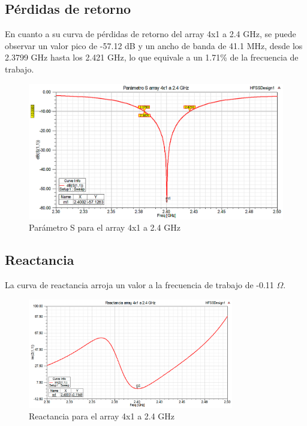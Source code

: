 \subsection{Pérdidas de retorno}
\par En cuanto a su curva de pérdidas de retorno del array 4x1 a 2.4 GHz, se puede observar un valor pico de -57.12 dB y un ancho de banda de 41.1 MHz, desde los 2.3799 GHz hasta los 2.421 GHz, lo que equivale a un 1.71\% de la frecuencia de trabajo.
\\
\begin{figure}[H]
    \centering
        \includegraphics[width=\textwidth]{archivos/analisis/4x11/1}
        \caption{Parámetro S para el array 4x1 a 2.4 GHz}
        \label{fig:s4x11}
\end{figure}

\newpage
\subsection{Reactancia}
\par La curva de reactancia arroja un valor a la frecuencia de trabajo de -0.11 $\Omega$. 
\\
\begin{figure}[H]
    \centering
        \includegraphics[width=0.8\textwidth]{archivos/analisis/4x11/2}
        \caption{Reactancia para el array 4x1 a 2.4 GHz}
        \label{fig:react4x11}
\end{figure}


